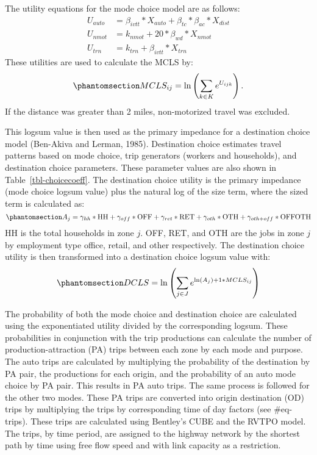 \documentclass[
  futuretransp,
  submit,
  moreauthors,
]{Definitions/mdpi}
\begin{document}
The utility equations for the mode choice model are as follows: \[
\begin{aligned}
U_{auto} &= \beta_{ivtt} * X_{auto} + \beta_{tc} * \beta_{ac} * X_{dist}\\
U_{nmot} &= k_{nmot} + 20 * \beta_{wd}*X_{nmot}\\
U_{trn} &= k_{trn} + \beta_{ivtt} * X_{trn}
\end{aligned}
\] These utilities are used to calculate the MCLS by:
\begin{equation}\phantomsection\label{eq-mcls}{
MCLS_{ij} = \ln\left(\sum_{k \in K} e^{U_{ijk}}\right).
}\end{equation} If the distance was greater than 2 miles, non-motorized
travel was excluded.

This logsum value is then used as the primary impedance for a
destination choice model (Ben-Akiva and Lerman, 1985). Destination
choice estimates travel patterns based on mode choice, trip generators
(workers and households), and destination choice parameters. These
parameter values are also shown in Table~\ref{tbl-choicecoeff}. The
destination choice utility is the primary impedance (mode choice logsum
value) plus the natural log of the size term, where the sized term is
calculated as: \begin{equation}\phantomsection\label{eq-dcsizeterm}{
A_j = \gamma_{hh} * \mathrm{HH} + \gamma_{off} * \mathrm{OFF} + \gamma_{ret} * \mathrm{RET} + \gamma_{oth} * \mathrm{OTH} + \\ \gamma_{oth+off} * \mathrm{OFFOTH}
}\end{equation} HH is the total households in zone \(j\). OFF, RET, and
OTH are the jobs in zone \(j\) by employment type office, retail, and
other respectively. The destination choice utility is then transformed
into a destination choice logsum value with:
\begin{equation}\phantomsection\label{eq-dcls}{
DCLS = \ln \left(\sum_{j \in J} e^{\ln(A_j) + 1* MCLS_{ij}}\right)
}\end{equation}

The probability of both the mode choice and destination choice are
calculated using the exponentiated utility divided by the corresponding
logsum. These probabilities in conjunction with the trip productions can
calculate the number of production-attraction (PA) trips between each
zone by each mode and purpose. The auto trips are calculated by
multiplying the probability of the destination by PA pair, the
productions for each origin, and the probability of an auto mode choice
by PA pair. This results in PA auto trips. The same process is followed
for the other two modes. These PA trips are converted into origin
destination (OD) trips by multiplying the trips by corresponding time of
day factors (see \#eq-trips). These trips are calculated using Bentley's
CUBE and the RVTPO model. The trips, by time period, are assigned to the
highway network by the shortest path by time using free flow speed and
with link capacity as a restriction.
\end{document}
